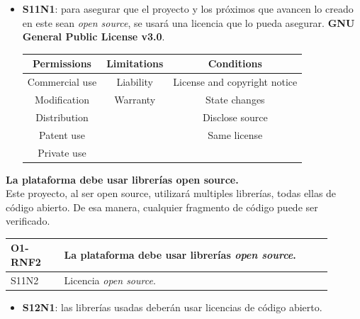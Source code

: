 \begin{itemize}
    \item \textbf{S11N1}: para asegurar que el proyecto y los próximos que avancen lo creado en este sean \textit{open source}, se usará una licencia que lo pueda asegurar. \textbf{GNU General Public License v3.0}.
    \begin{table}[h!]
        \centering
        \begin{tabular}{|c|c|c|}
            \hline
            Permissions         & Limitations   & Conditions \\
            \hline
            Commercial use      & Liability     & License and copyright notice \\
            \hline
            Modification        & Warranty      & State changes \\
            \hline
            Distribution        &               & Disclose source\\
            \hline
            Patent use          &               & Same license \\
            \hline
            Private use         &               & \\
            \hline
        \end{tabular}
        \cite{web:LICENSE}
    \end{table}
\end{itemize}
\textbf{La plataforma debe usar librerías open source.}\\
Este proyecto, al ser open source, utilizará multiples librerías, todas ellas de código abierto. De esa manera, cualquier fragmento de código puede ser verificado.
\begin{center}
    \begin{table}[h!]
        \begin{tabular}{|p{0.15\linewidth} | p{0.75\linewidth}|}
            \hline
             
            \textbf{O1-RNF2} & \textbf{La plataforma debe usar librerías \textit{open source}.} \\
            \hline
            S11N2            & Licencia \textit{open source}. \\
            \hline
        \end{tabular}
    \end{table}
\end{center}
\begin{itemize}
    \item \textbf{S12N1}: las librerías usadas deberán usar licencias de código abierto.
\end{itemize}
